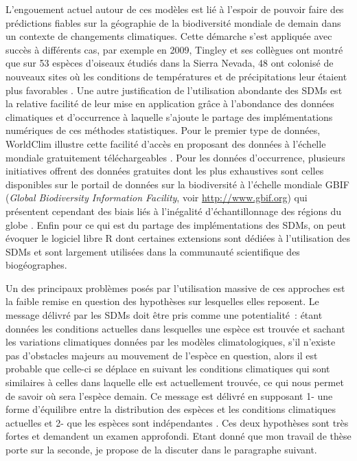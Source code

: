 L'engouement actuel autour de ces modèles est lié à l'espoir de pouvoir
faire des prédictions fiables sur la géographie de la biodiversité
mondiale de demain dans un contexte de changements climatiques. Cette
démarche s'est appliquée avec succès à différents cas, par exemple en
2009, Tingley et ses collègues ont montré que sur 53 espèces d'oiseaux
étudiés dans la Sierra Nevada, 48 ont colonisé de nouveaux sites où les
conditions de températures et de précipitations leur étaient plus
favorables \citep{Tingley2009}. Une autre justification de l'utilisation
abondante des SDMs est la relative facilité de leur mise en application
grâce à l'abondance des données climatiques et d'occurrence à laquelle
s'ajoute le partage des implémentations numériques de ces méthodes
statistiques. Pour le premier type de données, WorldClim illustre cette
facilité d'accès en proposant des données à l'échelle mondiale
gratuitement téléchargeables \citep[voir
\url{http://worldclim.org};][]{Hijmans2005}. Pour les données
d'occurrence, plusieurs initiatives offrent des données gratuites dont
les plus exhaustives sont celles disponibles sur le portail de données
sur la biodiversité à l'échelle mondiale GBIF (\emph{Global Biodiversity
Information Facility}, voir \url{http://www.gbif.org}) qui présentent
cependant des biais liés à l'inégalité d'échantillonnage des régions du
globe \citep{Beck2014a}. Enfin pour ce qui est du partage des
implémentations des SDMs, on peut évoquer le logiciel libre R
\citep{Rcoreteam2015} dont certaines extensions sont dédiées à
l'utilisation des SDMs et sont largement utilisées dans la communauté
scientifique des biogéographes.

Un des principaux problèmes posés par l'utilisation massive de ces
approches est la faible remise en question des hypothèses sur lesquelles
elles reposent. Le message délivré par les SDMs doit être pris comme une
potentialité~: étant données les conditions actuelles dans lesquelles
une espèce est trouvée et sachant les variations climatiques données par
les modèles climatologiques, s'il n'existe pas d'obstacles majeurs au
mouvement de l'espèce en question, alors il est probable que celle-ci se
déplace en suivant les conditions climatiques qui sont similaires à
celles dans laquelle elle est actuellement trouvée, ce qui nous permet
de savoir où sera l'espèce demain. Ce message est délivré en supposant
1- une forme d'équilibre entre la distribution des espèces et les
conditions climatiques actuelles et 2- que les espèces sont
indépendantes \citep{Jeschke2008}. Ces deux hypothèses sont très fortes
et demandent un examen approfondi. Etant donné que mon travail de thèse
porte sur la seconde, je propose de la discuter dans le paragraphe
suivant.

